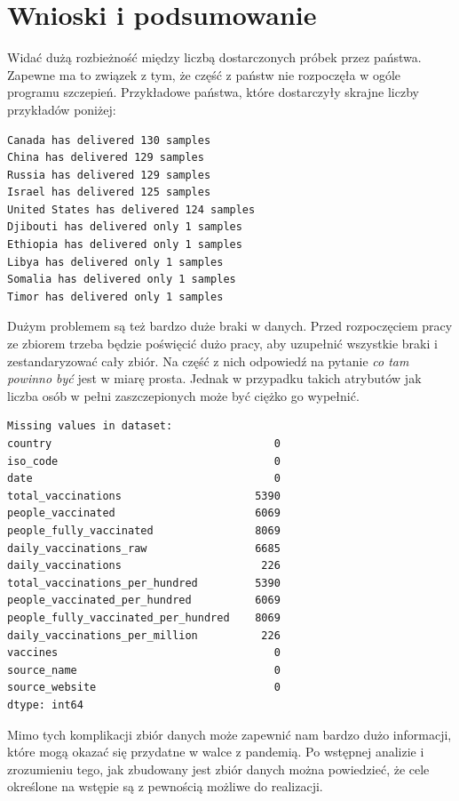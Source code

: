 \documentclass[12pt, oneside]{article}
\begin{document}
\section{Wnioski i podsumowanie}

Widać dużą rozbieżność między liczbą dostarczonych próbek przez państwa. Zapewne ma to związek z tym, że część z państw nie rozpoczęła w ogóle programu szczepień. Przykładowe państwa, które dostarczyły skrajne liczby przykładów poniżej:
\begin{verbatim}
Canada has delivered 130 samples
China has delivered 129 samples
Russia has delivered 129 samples
Israel has delivered 125 samples
United States has delivered 124 samples
Djibouti has delivered only 1 samples
Ethiopia has delivered only 1 samples
Libya has delivered only 1 samples
Somalia has delivered only 1 samples
Timor has delivered only 1 samples
\end{verbatim}

Dużym problemem są też bardzo duże braki w danych. Przed rozpoczęciem pracy ze zbiorem trzeba będzie poświęcić dużo pracy, aby uzupełnić wszystkie braki i zestandaryzować cały zbiór. Na część z nich odpowiedź na pytanie \textit{co tam powinno być} jest w miarę prosta. Jednak w przypadku takich atrybutów jak liczba osób w pełni zaszczepionych może być ciężko go wypełnić. 

\begin{verbatim}
Missing values in dataset: 
country                                   0
iso_code                                  0
date                                      0
total_vaccinations                     5390
people_vaccinated                      6069
people_fully_vaccinated                8069
daily_vaccinations_raw                 6685
daily_vaccinations                      226
total_vaccinations_per_hundred         5390
people_vaccinated_per_hundred          6069
people_fully_vaccinated_per_hundred    8069
daily_vaccinations_per_million          226
vaccines                                  0
source_name                               0
source_website                            0
dtype: int64
\end{verbatim}


Mimo tych komplikacji zbiór danych może zapewnić nam bardzo dużo informacji, które mogą okazać się przydatne w walce z pandemią. Po wstępnej analizie i zrozumieniu tego, jak zbudowany jest zbiór danych można powiedzieć, że cele określone na wstępie są z pewnością możliwe do realizacji. 
\end{document}
